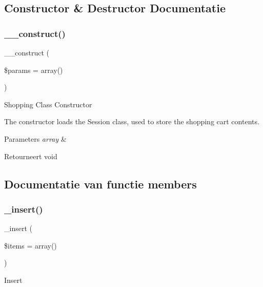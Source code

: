 \subsection{Constructor \& Destructor Documentatie}
\mbox{\label{class_c_i___cart_a568ecdb0d73d2a870f33189739922a50}} 
\subsubsection{\texorpdfstring{\_\_construct()}{\_\_construct()}}
{\footnotesize\ttfamily \+\_\+\+\_\+construct (\begin{DoxyParamCaption}\item[{}]{\$params = {\ttfamily array()} }\end{DoxyParamCaption})}

Shopping Class Constructor

The constructor loads the Session class, used to store the shopping cart contents.


\begin{DoxyParams}{Parameters}
{\em array} & \\
\hline
\end{DoxyParams}
\begin{DoxyReturn}{Retourneert}
void 
\end{DoxyReturn}


\subsection{Documentatie van functie members}
\mbox{\label{class_c_i___cart_a55d27979573b7d46bdf774f247c15b07}} 
\subsubsection{\texorpdfstring{\_insert()}{\_insert()}}
{\footnotesize\ttfamily \+\_\+insert (\begin{DoxyParamCaption}\item[{}]{\$items = {\ttfamily array()} }\end{DoxyParamCaption})\hspace{0.3cm}{\ttfamily [protected]}}

Insert


